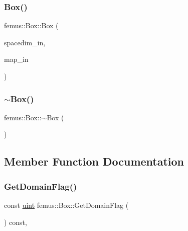 \subsubsection{\texorpdfstring{Box()}{Box()}}
{\footnotesize\ttfamily femus\+::\+Box\+::\+Box (\begin{DoxyParamCaption}\item[{const \mbox{\hyperlink{_typedefs_8hpp_a91ad9478d81a7aaf2593e8d9c3d06a14}{uint}}}]{spacedim\+\_\+in,  }\item[{\mbox{\hyperlink{classfemus_1_1_femus_input_parser}{Femus\+Input\+Parser}}$<$ double $>$ \&}]{map\+\_\+in }\end{DoxyParamCaption})}

\mbox{\label{classfemus_1_1_box_ad3446f7195748d6acb6dd9aa8eb6c949}} 
\subsubsection{\texorpdfstring{$\sim$\+Box()}{~Box()}}
{\footnotesize\ttfamily femus\+::\+Box\+::$\sim$\+Box (\begin{DoxyParamCaption}{ }\end{DoxyParamCaption})}



\subsection{Member Function Documentation}
\mbox{\label{classfemus_1_1_box_ae1e35410fff5545cd0c203cd9ad3001d}} 
\subsubsection{\texorpdfstring{Get\+Domain\+Flag()}{GetDomainFlag()}}
{\footnotesize\ttfamily const \mbox{\hyperlink{_typedefs_8hpp_a91ad9478d81a7aaf2593e8d9c3d06a14}{uint}} femus\+::\+Box\+::\+Get\+Domain\+Flag (\begin{DoxyParamCaption}{ }\end{DoxyParamCaption}) const\hspace{0.3cm}{\ttfamily [inline]}, {\ttfamily [virtual]}}



